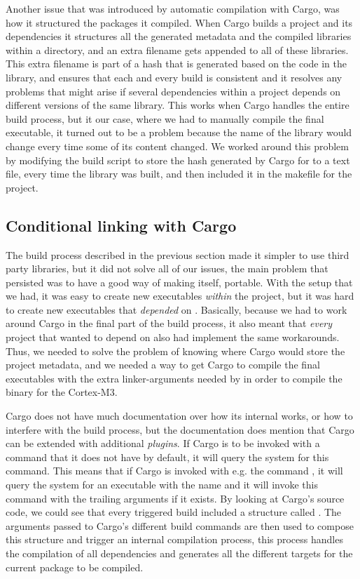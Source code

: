 Another issue that was introduced by automatic compilation with Cargo, was how it structured the packages it compiled.
When Cargo builds a project and its dependencies it structures all the generated metadata and the compiled libraries within a  directory, and an extra filename gets appended to all of these libraries.
This extra filename is part of a hash that is generated based on the code in the library, and ensures that each and every build is consistent and it resolves any problems that might arise if several dependencies within a project depends on different versions of the same library.
This works when Cargo handles the entire build process, but it our case, where we had to manually compile the final executable, it turned out to be a problem because the name of the library would change every time some of its content changed.
We worked around this problem by modifying the build script to store the hash generated by Cargo for {\emlib} to a text file, every time the library was built, and then included it in the makefile for the project.

\subsection{Conditional linking with Cargo}

The build process described in the previous section made it simpler to use third party libraries, but it did not solve all of our issues, the main problem that persisted was to have a good way of making {\emlib} itself, portable.
With the setup that we had, it was easy to create new executables \emph{within} the project, but it was hard to create new executables that \emph{depended} on {\emlib}.
Basically, because we had to work around Cargo in the final part of the build process, it also meant that \emph{every} project that wanted to depend on {\emlib} also had implement the same workarounds.
Thus, we needed to solve the problem of knowing where Cargo would store the project metadata, and we needed a way to get Cargo to compile the final executables with the extra linker-arguments needed by {\rustc} in order to compile the binary for the Cortex-M3.

Cargo does not have much documentation over how its internal works, or how to interfere with the build process, but the documentation does mention that Cargo can be extended with additional \emph{plugins}.
If Cargo is to be invoked with a command that it does not have by default, it will query the system for this command.
This means that if Cargo is invoked with e.g. the command , it will query the system for an executable with the name  and it will invoke this command with the trailing arguments if it exists.
By looking at Cargo's source code, we could see that every triggered build included a structure called .
The arguments passed to Cargo's different build commands are then used to compose this structure and trigger an internal compilation process, this process handles the compilation of all dependencies and generates all the different targets for the current package to be compiled.

